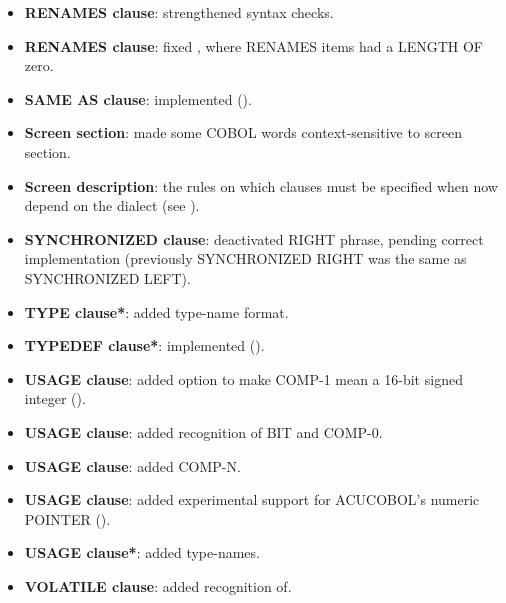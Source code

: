 \begin{itemize}
\item \textbf{RENAMES clause}: strengthened syntax checks.
\item \textbf{RENAMES clause}: fixed , where RENAMES items had a LENGTH OF zero.
\item \textbf{SAME AS clause}: implemented ().
\item \textbf{Screen section}: made some COBOL words context-sensitive to screen section.
\item \textbf{Screen description}: the rules on which clauses must be specified when now depend on the dialect (see ).
\item \textbf{SYNCHRONIZED clause}: deactivated RIGHT phrase, pending correct implementation (previously SYNCHRONIZED RIGHT was the same as SYNCHRONIZED LEFT).
\item \textbf{TYPE clause*}: added type-name format.
\item \textbf{TYPEDEF clause*}: implemented ().
\item \textbf{USAGE clause}: added option to make COMP-1 mean a 16-bit signed integer ().
\item \textbf{USAGE clause}: added recognition of BIT and COMP-0.
\item \textbf{USAGE clause}: added COMP-N.
\item \textbf{USAGE clause}: added experimental support for ACUCOBOL's numeric POINTER ().
\item \textbf{USAGE clause*}: added type-names.
\item \textbf{VOLATILE clause}: added recognition of.
\end{itemize}

